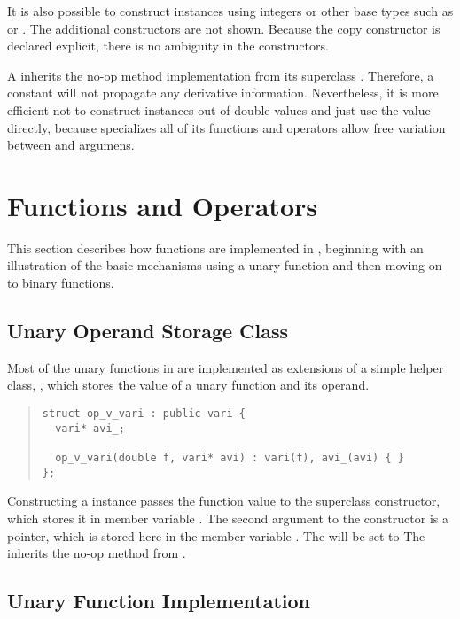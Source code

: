 \documentclass[10pt]{article}
\begin{document}
It is also possible to construct instances using integers or other
base types such as  or .  The
additional constructors are not shown.  Because the copy constructor
is declared explicit, there is no ambiguity in the constructors.

A  inherits the no-op  method implementation
from its superclass .  Therefore, a constant will not
propagate any derivative information.  Nevertheless, it is more
efficient not to construct  instances out of double values
and just use the  value directly, because
 specializes all of its functions and operators
allow free variation between  and  argumens.


\section{Functions and Operators}

This section describes how functions are implemented in
, beginning with an illustration of the basic
mechanisms using a unary function and then moving on to binary functions.

\subsection{Unary Operand Storage Class}

Most of the unary functions in  are implemented as
extensions of a simple helper class, , which stores
the value of a unary function and its operand.  
%
\begin{quote}
\begin{Verbatim}
struct op_v_vari : public vari {
  vari* avi_;

  op_v_vari(double f, vari* avi) : vari(f), avi_(avi) { }
};
\end{Verbatim}
\end{quote}
%
Constructing a  instance passes the function value
 to the superclass constructor, which stores it in member
variable .  The second argument to the constructor is a
 pointer, which is stored here in the member variable
.  The  will be set to The 
inherits the no-op  method from .

\subsection{Unary Function Implementation}
\end{document}
